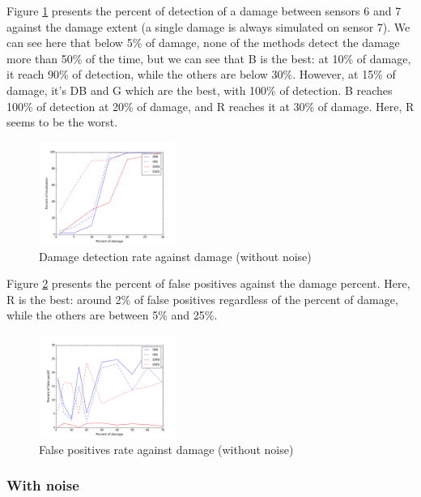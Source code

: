\documentclass[journal]{IEEEtran}
\begin{document}
Figure \ref{detect} presents the percent of detection of a damage between sensors 6 and 7 against the damage extent (a single damage is always simulated on sensor 7). We can see here that below 5\% of damage, none of the methods detect the damage more than 50\% of the time, but we can see that B is the best: at 10\% of damage, it reach 90\% of detection, while the others are below 30\%. However, at 15\% of damage, it's DB and G which are the best, with 100\% of detection. B reaches 100\% of detection at 20\% of damage, and R reaches it at 30\% of damage. Here, R seems to be the worst.

\begin{figure}[h!]
  \centering
  \includegraphics[width=0.4\textwidth]{images/detect.png}
  \caption{Damage detection rate against damage (without noise)}
  \label{detect}
\end{figure}


Figure \ref{fp} presents the percent of false positives against the damage percent. Here, R is the best: around 2\% of false positives regardless of the percent of damage, while the others are between 5\% and 25\%.


\begin{figure}[h!]
  \centering
  \includegraphics[width=0.4\textwidth]{images/fp.png}
  \caption{False positives rate against damage (without noise)}
  \label{fp}
\end{figure}



\subsubsection{With noise}
\end{document}
